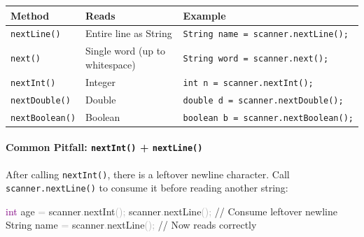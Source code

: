 \documentclass[
  justified,
  openright,
]{tufte-book}
\let\subsubsection\paragraph
\let\paragraph\paragraph
\newcommand{\BuiltInTok}[1]{#1}
\newcommand{\CommentTok}[1]{\textcolor{MidGray}{#1}}
\newcommand{\DataTypeTok}[1]{\textcolor{Purple}{#1}}
\newcommand{\FunctionTok}[1]{\textcolor{BrandBlue}{#1}}
\newcommand{\NormalTok}[1]{#1}
\newcommand{\OperatorTok}[1]{\textcolor{DarkGray}{#1}}
\newenvironment{Shaded}{%
  \begin{snugshade}
}{%
  \end{snugshade}
}
\let\subsubsection\paragraph
\let\paragraph\paragraph
\begin{document}
{\def\LTcaptype{none} %
\begin{longtable}[]{@{}
  >{\raggedright\arraybackslash}p{}
  >{\raggedright\arraybackslash}p{}
  >{\raggedright\arraybackslash}p{}@{}}
\toprule\noalign{}
\begin{minipage}[b]{\linewidth}\raggedright
Method
\end{minipage} & \begin{minipage}[b]{\linewidth}\raggedright
Reads
\end{minipage} & \begin{minipage}[b]{\linewidth}\raggedright
Example
\end{minipage} \\
\midrule\noalign{}
\endhead
\bottomrule\noalign{}
\endlastfoot
\texttt{nextLine()} & Entire line as String &
\texttt{String\ name\ =\ scanner.nextLine();} \\
\texttt{next()} & Single word (up to whitespace) &
\texttt{String\ word\ =\ scanner.next();} \\
\texttt{nextInt()} & Integer & \texttt{int\ n\ =\ scanner.nextInt();} \\
\texttt{nextDouble()} & Double &
\texttt{double\ d\ =\ scanner.nextDouble();} \\
\texttt{nextBoolean()} & Boolean &
\texttt{boolean\ b\ =\ scanner.nextBoolean();} \\
\end{longtable}
}

\subsubsection{\texorpdfstring{Common Pitfall: \texttt{nextInt()} +
\texttt{nextLine()}}{Common Pitfall: nextInt() + nextLine()}}\label{common-pitfall-nextint-nextline}

After calling \texttt{nextInt()}, there is a leftover newline character.
Call \texttt{scanner.nextLine()} to consume it before reading another
string:

\begin{Shaded}
\begin{Highlighting}[]
\DataTypeTok{int}\NormalTok{ age }\OperatorTok{=}\NormalTok{ scanner}\OperatorTok{.}\FunctionTok{nextInt}\OperatorTok{();}
\NormalTok{scanner}\OperatorTok{.}\FunctionTok{nextLine}\OperatorTok{();}            \CommentTok{// Consume leftover newline}
\BuiltInTok{String}\NormalTok{ name }\OperatorTok{=}\NormalTok{ scanner}\OperatorTok{.}\FunctionTok{nextLine}\OperatorTok{();}  \CommentTok{// Now reads correctly}
\end{Highlighting}
\end{Shaded}
\end{document}
